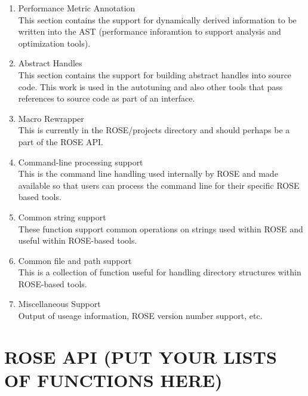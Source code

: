 \begin{enumerate}
\begin{enumerate}
      \item Performance Metric Annotation \\
         This section contains the support for dynamically derived information to be
         written into the AST (performance inforamtion to support analysis and
         optimization tools).

      \item Abstract Handles \\
         This section contains the support for building abstract handles into source code.
         This work is used in the autotuning and also other tools that pass references to
         source code as part of an interface.

      \item Macro Rewrapper \\
         This is currently in the ROSE/projects directory and should perhaps be a part of
         the ROSE API.

      \item Command-line processing support \\
         This is the command line handling used internally by ROSE and made available 
         so that users can process the command line for their specific ROSE based tools.

      \item Common string support \\
         These function support common operations on strings used within ROSE and 
         useful within ROSE-based tools.

      \item Common file and path support \\
         This is a collection of function useful for handling directory structures within
         ROSE-based tools.

      \item Miscellaneous Support \\
         Output of useage information, ROSE version number support, etc.

   \end{enumerate}

\end{enumerate}


\newpage


\section{ROSE API (PUT YOUR LISTS OF FUNCTIONS HERE)}

